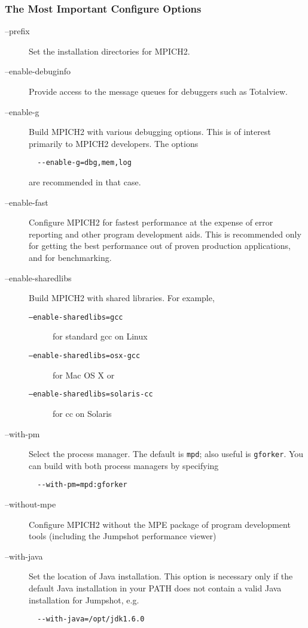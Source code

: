 \documentclass[dvipdfm,11pt]{article}
\begin{document}
\subsubsection{The Most Important Configure Options}
\label{sec:important-configure-options}
\begin{description}
\item[--prefix]Set the installation directories for MPICH2.  
\item[--enable-debuginfo]Provide access to the message queues for
  debuggers such as Totalview.
\item[--enable-g]Build MPICH2 with various debugging options.  This is
  of interest primarily to MPICH2 developers.  The options
\begin{verbatim}
  --enable-g=dbg,mem,log
\end{verbatim}
 are recommended in that case.
\item[--enable-fast]Configure MPICH2 for fastest performance at the
  expense of error reporting and other program development aids.  This
  is recommended only for getting the best performance out of proven
  production applications, and for benchmarking.
\item[--enable-sharedlibs]Build MPICH2 with shared libraries. 
  For example, 
\begin{description}
\item[\texttt{--enable-sharedlibs=gcc}]for standard gcc on Linux  
\item[\texttt{--enable-sharedlibs=osx-gcc}]for Mac OS X or
\item[\texttt{--enable-sharedlibs=solaris-cc}]for cc on Solaris
\end{description}
\item[--with-pm]Select the process manager.  The default is
  \texttt{mpd}; also useful is \texttt{gforker}.  You can build with
  both process managers by specifying
\begin{verbatim}
  --with-pm=mpd:gforker
\end{verbatim}
\item[--without-mpe]Configure MPICH2 without the MPE package of
  program development tools (including the Jumpshot performance viewer)
\item[--with-java]Set the location of Java installation.  This option
is necessary only if the default Java installation in your PATH does
not contain a valid Java installation for Jumpshot, e.g.
\begin{verbatim}
  --with-java=/opt/jdk1.6.0
\end{verbatim}
\end{description}
\end{document}
